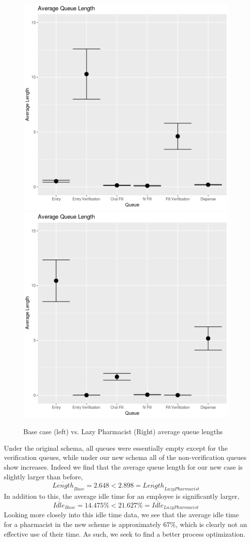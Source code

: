\documentclass[10pt]{report}            %
\begin{document}
\begin{figure}[H]
\centering
\includegraphics[scale=.35]{BaseQueueCIs.png}
\includegraphics[scale=.35]{ProfQueueCIs.png}
\caption{Base case (left) vs. Lazy Pharmacist (Right) average queue lengths}
\label{fig:basevprof}
\end{figure}
Under the original schema, all queues were essentially empty except for the verification queues, while under our new schema all of the non-verification queues show increases. Indeed we find that the average queue length for our new case is slightly larger than before,
\[\overline{Length}_{Base}=2.648<2.898=\overline{Length}_{Lazy Pharmacist}\]
In addition to this, the average idle time for an employee is significantly larger,
\[\overline{Idle}_{Base}=14.475\% < 21.627\%=\overline{Idle}_{Lazy Pharmacist}\]
Looking more closely into this idle time data, we see that the average idle time for a pharmacist in the new scheme is approximately $67\%$, which is clearly not an effective use of their time. As such, we seek to find a better process optimization.
\end{document}
